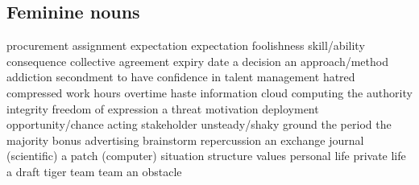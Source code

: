 \subsection*{Feminine nouns}
   {procurement}
   {assignment}
   {expectation}
   {expectation}
   {foolishness}
   {skill/ability}
   {consequence}
   {collective agreement}
   {expiry date}
   {a decision}
   {an approach/method}
   {addiction}
   {secondment}
   {to have confidence in}
   {talent management}
   {hatred}
   {compressed work hours}
   {overtime}
   {haste}
   {information}
   {cloud computing}
   {the authority}
   {integrity}
   {freedom of expression}
   {a threat}
   {motivation}
   {deployment}
   {opportunity/chance}
   {acting}
   {stakeholder}
   {unsteady/shaky ground}
   {the period}
   {the majority}
   {bonus}
   {advertising}
   {brainstorm}
   {repercussion}
   {an exchange}
   {journal (scientific)}
   {a patch (computer)}
   {situation}
   {structure}
   {values}
   {personal life}
   {private life}
   {a draft}
   {tiger team}
   {team}
   {an obstacle}

